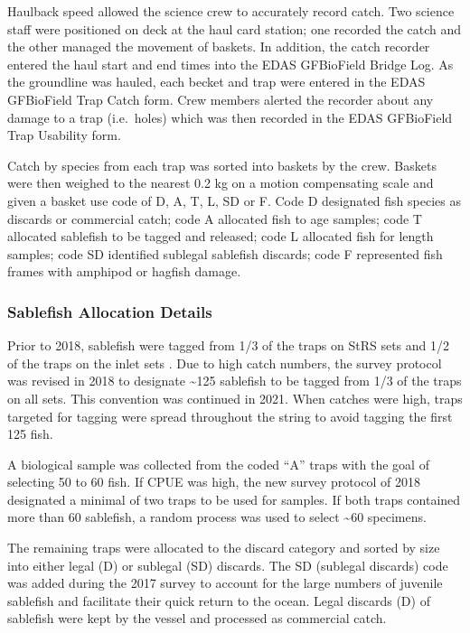 \documentclass[12pt]{article}\usepackage[]{graphicx}\usepackage[]{color}
\begin{document}
Haulback speed allowed the science crew to accurately record catch. Two science staff were positioned on deck at the haul card station; one recorded the catch and the other managed the movement of baskets. In addition, the catch recorder entered the haul start and end times into the EDAS GFBioField Bridge Log. As the groundline was hauled, each becket and trap were entered in the EDAS GFBioField Trap Catch form. Crew members alerted the recorder about any damage to a trap (i.e.~holes) which was then recorded in the EDAS GFBioField Trap Usability form.

Catch by species from each trap was sorted into baskets by the crew. Baskets were then weighed to the nearest 0.2 kg on a motion compensating scale and given a basket use code of D, A, T, L, SD or F. Code D designated fish species as discards or commercial catch; code A allocated fish to age samples; code T allocated sablefish to be tagged and released; code L allocated fish for length samples; code SD identified sublegal sablefish discards; code F represented fish frames with amphipod or hagfish damage.

\hypertarget{sablefish-allocation-details}{%
\subsubsection{Sablefish Allocation Details}\label{sablefish-allocation-details}}

Prior to 2018, sablefish were tagged from 1/3 of the traps on StRS sets and 1/2 of the traps on the inlet sets . Due to high catch numbers, the survey protocol was revised in 2018 to designate \textasciitilde125 sablefish to be tagged from 1/3 of the traps on all sets. This convention was continued in 2021. When catches were high, traps targeted for tagging were spread throughout the string to avoid tagging the first 125 fish.

A biological sample was collected from the coded ``A'' traps with the goal of selecting 50 to 60 fish. If CPUE was high, the new survey protocol of 2018 designated a minimal of two traps to be used for samples. If both traps contained more than 60 sablefish, a random process was used to select \textasciitilde60 specimens.

The remaining traps were allocated to the discard category and sorted by size into either legal (D) or sublegal (SD) discards. The SD (sublegal discards) code was added during the 2017 survey to account for the large numbers of juvenile sablefish and facilitate their quick return to the ocean. Legal discards (D) of sablefish were kept by the vessel and processed as commercial catch.
\end{document}
